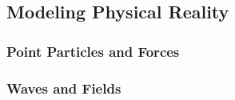 
\subsection{Modeling Physical Reality}

\subsubsection{Point Particles and Forces}


\subsubsection{Waves and Fields}

